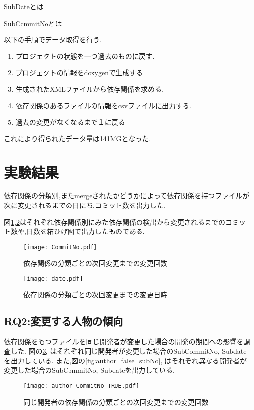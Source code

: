\documentclass[submit,ses,noauthor]{ipsj} %
\begin{document}
SubDateとは

SubCommitNoとは


以下の手順でデータ取得を行う.
\begin{enumerate}
\item プロジェクトの状態を一つ過去のものに戻す.
\item プロジェクトの情報をdoxygenで生成する
\item 生成されたXMLファイルから依存関係を求める.
\item 依存関係のあるファイルの情報をcsvファイルに出力する.
\item 過去の変更がなくなるまで１に戻る
\end{enumerate}

これにより得られたデータ量は141MGとなった.


\section{実験結果}\label{実験結果}
依存関係の分類別,またmergeされたかどうかによって依存関係を持つファイルが次に変更されるまでの日にち,コミット数を出力した.


図\ref{fig:subNo},\ref{fig:subdate}はそれぞれ依存関係別にみた依存関係の検出から変更されるまでのコミット数や,日数を箱ひげ図で出力したものである.　　

\begin{figure}
\centering
\texttt{[image: CommitNo.pdf]}
\caption{依存関係の分類ごとの次回変更までの変更回数}
\label{fig:subNo} 
\end{figure}

\begin{figure}
\centering
\texttt{[image: date.pdf]}
\caption{依存関係の分類ごとの次回変更までの変更日時}
\label{fig:subdate} 
\end{figure}


\subsection{RQ2:変更する人物の傾向}
依存関係をもつファイルを同じ開発者が変更した場合の開発の期間への影響を調査した.
図の\ref{fig:author_true_subNo},\label{fig:author_true_subdate} はそれぞれ同じ開発者が変更した場合のSubCommitNo, Subdateを出力している.
また,図の\ref{fig:author_false_subNo},\label{fig:author_false_subdate} はそれぞれ異なる開発者が変更した場合のSubCommitNo, Subdateを出力している.


\begin{figure}
\centering
\texttt{[image: author\_CommitNo\_TRUE.pdf]}
\caption{同じ開発者の依存関係の分類ごとの次回変更までの変更回数}
\label{fig:author_true_subNo} 
\end{figure}
\end{document}
